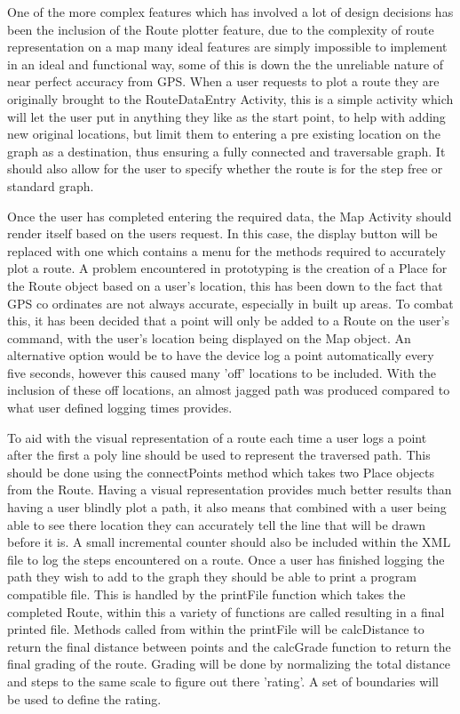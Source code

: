 One of the more complex features which has involved a lot of design decisions has been the inclusion of the Route plotter feature, due to the complexity of route representation on a map many ideal features are simply impossible to implement in an ideal and functional way, some of this is down the the unreliable nature of near perfect accuracy from GPS. When a user requests to plot a route they are originally brought to the RouteDataEntry Activity, this is a simple activity which will let the user put in anything they like as the start point, to help with adding new original locations, but limit them to entering a pre existing location on the graph as a destination, thus ensuring a fully connected and traversable graph. It should also allow for the user to specify whether the route is for the step free or standard graph. 

Once the user has completed entering the required data, the Map Activity should render itself based on the users request. In this case, the display button will be replaced with one which contains a menu for the methods required to accurately plot a route. A problem encountered in prototyping is the creation of a Place for the Route object based on a user's location, this has been down to the fact that GPS co ordinates are not always accurate, especially in built up areas. To combat this, it has been decided that a point will only be added to a Route on the user's command, with the user's location being displayed on the Map object. An alternative option would be to have the device log a point automatically every five seconds, however this caused many 'off' locations to be included. With the inclusion of these off locations, an almost jagged path was produced compared to what user defined logging times provides. 

To aid with the visual representation of a route each time a user logs a point after the first a poly line should be used to represent the traversed path. This should be done using the connectPoints method which takes two Place objects from the Route. Having a visual representation provides much better results than having a user blindly plot a path, it also means that combined with a user being able to see there location they can accurately tell the line that will be drawn before it is. A small incremental counter should also be included within the XML file to log the steps encountered on a route. Once a user has finished logging the path they wish to add to the graph they should be able to print a program compatible file. This is handled by the printFile function which takes the completed Route, within this a variety of functions are called resulting in a final printed file. Methods called from within the printFile will be calcDistance to return the final distance between points and the calcGrade function to return the final grading of the route. Grading will be done by normalizing the total distance and steps to the same scale to figure out there 'rating'. A set of boundaries will be used to define the rating.

